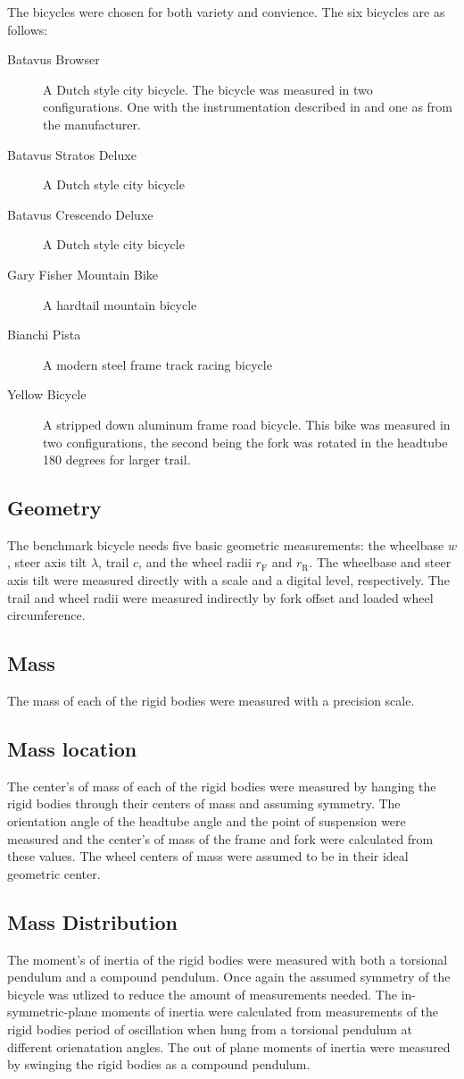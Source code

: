 \documentclass{bmd2010a}
\begin{document}
The bicycles were chosen for both variety and convience. The six bicycles are as follows:
\begin{description}
    \item[Batavus Browser] A Dutch style city bicycle. The bicycle was measured
        in two configurations. One with the instrumentation described in
        \cite{Kooijman2009a} and one as from the manufacturer.
    \item[Batavus Stratos Deluxe] A Dutch style city bicycle
    \item[Batavus Crescendo Deluxe] A Dutch style city bicycle
    \item[Gary Fisher Mountain Bike] A hardtail mountain bicycle
    \item[Bianchi Pista] A modern steel frame track racing bicycle
    \item[Yellow Bicycle] A stripped down aluminum frame road bicycle. This
        bike was measured in two configurations, the second being the fork was
        rotated in the headtube 180 degrees for larger trail.
\end{description}
\subsection*{Geometry}
The benchmark bicycle needs five basic geometric measurements: the wheelbase
$w$, steer axis tilt $\lambda$, trail $c$, and the wheel radii $r_\mathrm{F}$
and $r_\mathrm{R}$. The wheelbase and steer axis tilt were measured directly
with a scale and a digital level, respectively. The trail and wheel radii were
measured indirectly by fork offset and loaded wheel circumference.
\subsection*{Mass}
The mass of each of the rigid bodies were measured with a precision scale.
\subsection*{Mass location}
The center's of mass of each of the rigid bodies were measured by hanging the
rigid bodies through their centers of mass and assuming symmetry. The
orientation angle of the headtube angle and the point of suspension were
measured and the center's of mass of the frame and fork were calculated from
these values. The wheel centers of mass were assumed to be in their ideal
geometric center.
\subsection*{Mass Distribution}
The moment's of inertia of the rigid bodies were measured with both a torsional
pendulum and a compound pendulum. Once again the assumed symmetry of the
bicycle was utlized to reduce the amount of measurements needed. The
in-symmetric-plane moments of inertia were calculated from measurements of the
rigid bodies period of oscillation when hung from a torsional pendulum at
different orienatation angles. The out of plane moments of inertia were
measured by swinging the rigid bodies as a compound pendulum.
\end{document}

